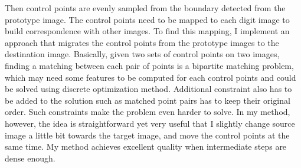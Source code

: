 \documentclass{iitthesis}
\begin{document}
Then control points are evenly sampled from the boundary detected from the prototype image. The control points need to be mapped to each digit image to build correspondence with other images. To find this mapping, I implement an approach that migrates the control points from the prototype images to the destination image. Basically, given two sets of control points on two images, finding a matching between each pair of points is a bipartite matching problem, which may need some features to be computed for each control points and could be solved using discrete optimization method. Additional constraint also has to be added to the solution such as matched point pairs has to keep their original order. Such constraints make the problem even harder to solve. In my method, however, the idea is straightforward yet very useful that I slightly change source image a little bit towards the target image, and move the control points at the same time. My method achieves excellent quality when intermediate steps are dense enough.
\end{document}
